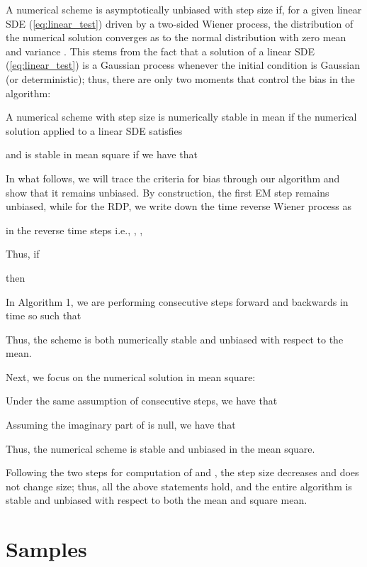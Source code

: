 \documentclass{article}
\begin{document}
A numerical scheme is asymptotically unbiased with step size 
if, for a given linear SDE (\ref{eq:linear_test}) driven by a two-sided
Wiener process, the distribution of the numerical solution 
converges as  to the normal distribution with
zero mean and variance \citep{artemiev2011numerical}.
This stems from the fact that a solution of a linear SDE (\ref{eq:linear_test})
is a Gaussian process whenever the initial condition is Gaussian (or
deterministic); thus, there are only two moments that control the
bias in the algorithm: 


A numerical scheme with step size  is numerically stable in mean
if the numerical solution  applied to a linear
SDE satisfies 

and is stable in mean square \citep{saito1996stability} if we have that


In what follows, we will trace the criteria for bias through our algorithm
and show that it remains unbiased. By construction, the first
EM step remains unbiased, while for the RDP, we write down the time
reverse Wiener process as

in the reverse time steps  i.e., , ,

Thus, if 

then 

In Algorithm 1, we are performing consecutive steps forward and backwards
in time so  such that

Thus, the scheme is both numerically stable and unbiased with respect to the mean. 

Next, we focus on the numerical solution in mean square:

Under the same assumption of consecutive steps, we have that



Assuming the imaginary part of  is null, we have that

Thus, the numerical scheme is stable and unbiased in the mean square.

Following the two steps for computation of  and
, the step size decreases and does not
change size; thus, all the above statements hold, and the entire algorithm is stable and unbiased with respect to both the mean and square mean.

\clearpage
\section{Samples}
\end{document}

